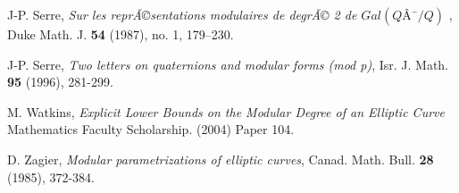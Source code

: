 \documentclass[13pt]{amsart}
\theoremstyle{remark}
\numberwithin{theorem}{section} \numberwithin{equation}{section}
\begin{document}
\begin{thebibliography}{99}
 J-P. Serre, \emph{Sur les reprÃ©sentations modulaires de degrÃ© 2 de  $Gal ( Q Â¯ / Q )$} , Duke Math. J. \textbf{54} (1987), no. 1, 179--230.

 J-P. Serre, \emph{Two letters on quaternions and modular forms (mod p)}, Isr. J. Math. \textbf{95} (1996), 281-299.

 M. Watkins, \emph{Explicit Lower Bounds on the Modular Degree of an Elliptic Curve}  Mathematics Faculty Scholarship. (2004) Paper
104.

 D. Zagier, \emph{Modular parametrizations of elliptic curves}, Canad. Math. Bull. \textbf{28} (1985), 372-384.
\end{thebibliography}
\end{document}
